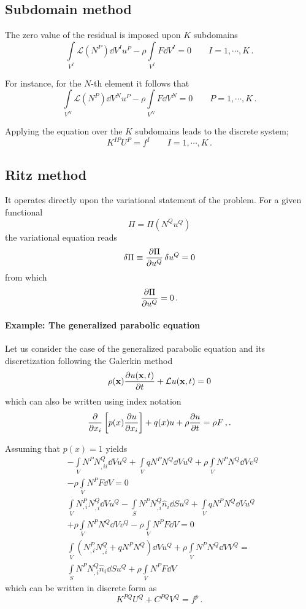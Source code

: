 \subsection{Subdomain method}
The zero value of the residual is imposed upon $K$ subdomains
\[\int\limits_{V^I} \mathcal{L}(N^P)\dd{V^I} u^P  - \rho \int\limits_{V^I}  F\dd{V^I}  = 0 \qquad I=1,\cdots,K\, .\]

For instance, for the $N$-th element it follows that
\[\int\limits_{V^N} \mathcal{L}(N^P)\dd{V^N} u^P  - \rho \int\limits_{V^N} F\dd{V^N}  = 0 \qquad P=1,\cdots,K\, .\]

Applying the equation over the $K$ subdomains leads to the discrete system;
\begin{equation}
K^{IP} U^P = f^I \quad \quad I=1,\cdots,K\, .
\label{eq:Subdomain}
\end{equation}

\subsection{Ritz method}
It operates directly upon the variational statement of the problem. For a given functional
\[\Pi  = \Pi (N^Q u^Q)\]
the variational equation reads
\[\var{\Pi}  \equiv \pdv{\Pi}{u^Q} \var{u^Q} = 0\]
from which
\[\pdv{\Pi}{u^Q} = 0\, .\]

\paragraph*{Example: The generalized parabolic equation}
Let us consider the case of the generalized parabolic equation and its discretization following the Galerkin method
\[\rho(\vb x) \pdv{u(\vb x,t)}{t} + \mathcal{L}u(\vb x, t) = 0\]
which can also be written using index notation
\[\pdv{x_i}\left[p(x)\pdv{u}{x_i} \right] + q(x)u + \rho \pdv{u}{t} = \rho F\, 
,.\]

Assuming that $p(x)=1$ yields
\begin{align*}
  &-\int\limits_V N^P N_{,ii}^Q \dd{V} u^Q + \int\limits_V q N^P N^Q\dd{V} u^Q  + \rho \int\limits_V N^P N^Q \dd{V} v^Q\\
     &- \rho \int\limits_V N^P F \dd{V} = 0\\
  &\int\limits_V N_{,i}^P N_{,i}^Q \dd{V} u^Q - \int\limits_S N^P N_{,i}^Q \hat{n}_i \dd{S} u^Q + \int\limits_V q N^P N^Q \dd{V} u^Q\\
    &+ \rho \int\limits_V N^P N^Q \dd{V} v^Q  - \rho \int\limits_V N^P F \dd{V} = 0 \\
  &\int\limits_V \left(N_{,i}^P N_{,i}^Q + q N^PN^Q \right)\dd{V} u^Q  + \rho \int\limits_V N^P N^Q \dd{V} V^Q  =\\
      &\int\limits_S N^P N_{,i}^Q \hat{n}_i \dd{S} u^Q + \rho \int\limits_V N^P F \dd{V}
\end{align*}
which can be written in discrete form as
\[K^{PQ} U^Q + C^{PQ} V^Q = f^p\, .\]

